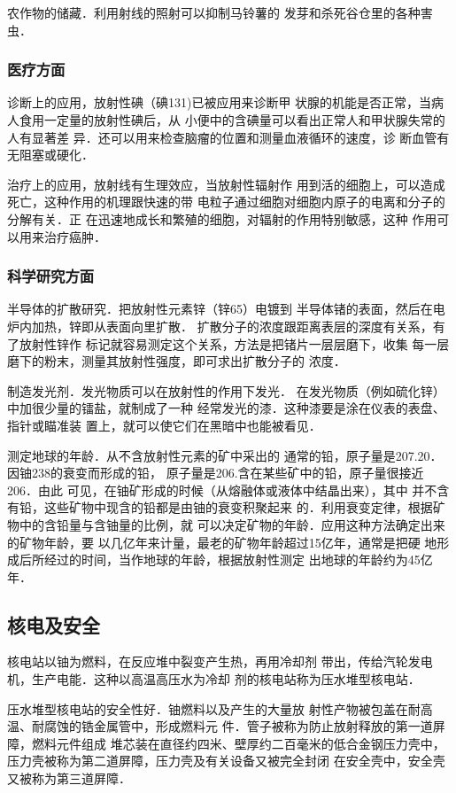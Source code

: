 农作物的储藏．利用射线的照射可以抑制马铃薯的
发芽和杀死谷仓里的各种害虫．

\subsubsection{医疗方面}
诊断上的应用，放射性碘（碘131)已被应用来诊断甲
状腺的机能是否正常，当病人食用一定量的放射性碘后，从
小便中的含碘量可以看出正常人和甲状腺失常的人有显著差
异．还可以用来检查脑瘤的位置和测量血液循环的速度，诊
断血管有无阻塞或硬化．

治疗上的应用，放射线有生理效应，当放射性辐射作
用到活的细胞上，可以造成死亡，这种作用的机理跟快速的带
电粒子通过细胞对细胞内原子的电离和分子的分解有关．正
在迅速地成长和繁殖的细胞，对辐射的作用特别敏感，这种
作用可以用来治疗癌肿．

\subsubsection{科学研究方面}

半导体的扩散研究．把放射性元素锌（锌65）电镀到
半导体锗的表面，然后在电炉内加热，锌即从表面向里扩散．
扩散分子的浓度跟距离表层的深度有关系，有了放射性锌作
标记就容易测定这个关系，方法是把锗片一层层磨下，收集
每一层磨下的粉末，测量其放射性强度，即可求出扩散分子的
浓度．

制造发光剂．发光物质可以在放射性的作用下发光．
在发光物质（例如硫化锌）中加很少量的镭盐，就制成了一种
经常发光的漆．这种漆要是涂在仪表的表盘、指针或瞄准装
置上，就可以使它们在黑暗中也能被看见．

测定地球的年龄．从不含放射性元素的矿中采出的
通常的铅，原子量是207.20．因铀238的衰变而形成的铅，
原子量是206.含在某些矿中的铅，原子量很接近206．由此
可见，在铀矿形成的时候（从熔融体或液体中结晶出来），其中
并不含有铅，这些矿物中现含的铅都是由铀的衰变积聚起来
的．利用衰变定律，根据矿物中的含铅量与含铀量的比例，就
可以决定矿物的年龄．应用这种方法确定出来的矿物年龄，要
以几亿年来计量，最老的矿物年龄超过15亿年，通常是把硬
地形成后所经过的时间，当作地球的年龄，根据放射性测定
出地球的年龄约为45亿年．

\subsection{核电及安全}
核电站以铀为燃料，在反应堆中裂变产生热，再用冷却剂
带出，传给汽轮发电机，生产电能．这种以高温高压水为冷却
剂的核电站称为压水堆型核电站．

压水堆型核电站的安全性好．铀燃料以及产生的大量放
射性产物被包盖在耐高温、耐腐蚀的锆金属管中，形成燃料元
件．管子被称为防止放射释放的第一道屏障，燃料元件组成
堆芯装在直径约四米、壁厚约二百毫米的低合金钢压力壳中，
压力壳被称为第二道屏障，压力壳及有关设备又被完全封闭
在安全壳中，安全壳又被称为第三道屏障．

